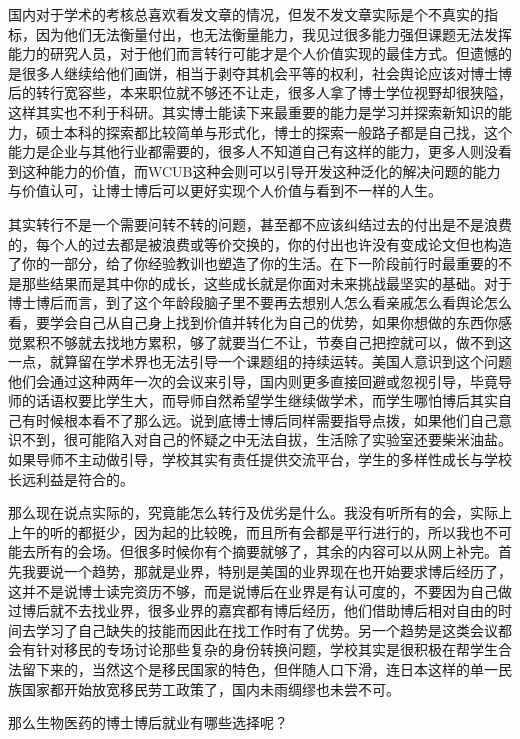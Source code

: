 \documentclass[
]{book}
\begin{document}
国内对于学术的考核总喜欢看发文章的情况，但发不发文章实际是个不真实的指标，因为他们无法衡量付出，也无法衡量能力，我见过很多能力强但课题无法发挥能力的研究人员，对于他们而言转行可能才是个人价值实现的最佳方式。但遗憾的是很多人继续给他们画饼，相当于剥夺其机会平等的权利，社会舆论应该对博士博后的转行宽容些，本来职位就不够还不让走，很多人拿了博士学位视野却很狭隘，这样其实也不利于科研。其实博士能读下来最重要的能力是学习并探索新知识的能力，硕士本科的探索都比较简单与形式化，博士的探索一般路子都是自己找，这个能力是企业与其他行业都需要的，很多人不知道自己有这样的能力，更多人则没看到这种能力的价值，而WCUB这种会则可以引导开发这种泛化的解决问题的能力与价值认可，让博士博后可以更好实现个人价值与看到不一样的人生。

其实转行不是一个需要问转不转的问题，甚至都不应该纠结过去的付出是不是浪费的，每个人的过去都是被浪费或等价交换的，你的付出也许没有变成论文但也构造了你的一部分，给了你经验教训也塑造了你的生活。在下一阶段前行时最重要的不是那些结果而是其中你的成长，这些成长就是你面对未来挑战最坚实的基础。对于博士博后而言，到了这个年龄段脑子里不要再去想别人怎么看亲戚怎么看舆论怎么看，要学会自己从自己身上找到价值并转化为自己的优势，如果你想做的东西你感觉累积不够就去找地方累积，够了就要当仁不让，节奏自己把控就可以，做不到这一点，就算留在学术界也无法引导一个课题组的持续运转。美国人意识到这个问题他们会通过这种两年一次的会议来引导，国内则更多直接回避或忽视引导，毕竟导师的话语权要比学生大，而导师自然希望学生继续做学术，而学生哪怕博后其实自己有时候根本看不了那么远。说到底博士博后同样需要指导点拨，如果他们自己意识不到，很可能陷入对自己的怀疑之中无法自拔，生活除了实验室还要柴米油盐。如果导师不主动做引导，学校其实有责任提供交流平台，学生的多样性成长与学校长远利益是符合的。

那么现在说点实际的，究竟能怎么转行及优劣是什么。我没有听所有的会，实际上上午的听的都挺少，因为起的比较晚，而且所有会都是平行进行的，所以我也不可能去所有的会场。但很多时候你有个摘要就够了，其余的内容可以从网上补完。首先我要说一个趋势，那就是业界，特别是美国的业界现在也开始要求博后经历了，这并不是说博士读完资历不够，而是说博后在业界是有认可度的，不要因为自己做过博后就不去找业界，很多业界的嘉宾都有博后经历，他们借助博后相对自由的时间去学习了自己缺失的技能而因此在找工作时有了优势。另一个趋势是这类会议都会有针对移民的专场讨论那些复杂的身份转换问题，学校其实是很积极在帮学生合法留下来的，当然这个是移民国家的特色，但伴随人口下滑，连日本这样的单一民族国家都开始放宽移民劳工政策了，国内未雨绸缪也未尝不可。

那么生物医药的博士博后就业有哪些选择呢？
\end{document}
